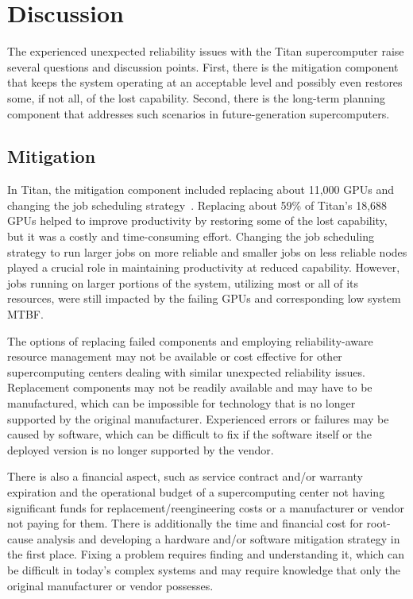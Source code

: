 \section{Discussion}
\label{section:discussion}

The experienced unexpected reliability issues with the Titan supercomputer raise
several questions and discussion points. First, there is the mitigation component
that keeps the system operating at an acceptable level and possibly even restores
some, if not all, of the lost capability. Second, there is the long-term planning
component that addresses such scenarios in future-generation supercomputers.

\subsection{Mitigation}
\label{section:mitigation}

In Titan, the mitigation component included replacing about 11,000 GPUs and
changing the job scheduling strategy~\cite{8665764}. Replacing about 59\% of
Titan's 18,688 GPUs helped to improve productivity by restoring some of the lost
capability, but it was a costly and time-consuming effort. Changing the job
scheduling strategy to run larger jobs on more reliable and smaller jobs on less
reliable nodes played a crucial role in maintaining productivity at reduced
capability. However, jobs running on larger portions of the system, utilizing
most or all of its resources, were still impacted by the failing GPUs and
corresponding low system MTBF.

The options of replacing failed components and employing reliability-aware
resource management may not be available or cost effective for other
supercomputing centers dealing with similar unexpected reliability issues.
%
Replacement components may not be readily available and may have to be
manufactured, which can be impossible for technology that is no longer supported
by the original manufacturer. Experienced errors or failures may be caused by
software, which can be difficult to fix if the software itself or the deployed
version is no longer supported by the vendor.

There is also a financial aspect, such as service contract and/or warranty
expiration and the operational budget of a supercomputing center not having
significant funds for replacement/reengineering costs or a manufacturer or
vendor not paying for them.
%
There is additionally the time and financial cost for root-cause analysis and
developing a hardware and/or software mitigation strategy in the first place.
Fixing a problem requires finding and understanding it, which can be difficult 
in today's complex systems and may require knowledge that only the original 
manufacturer or vendor possesses.


